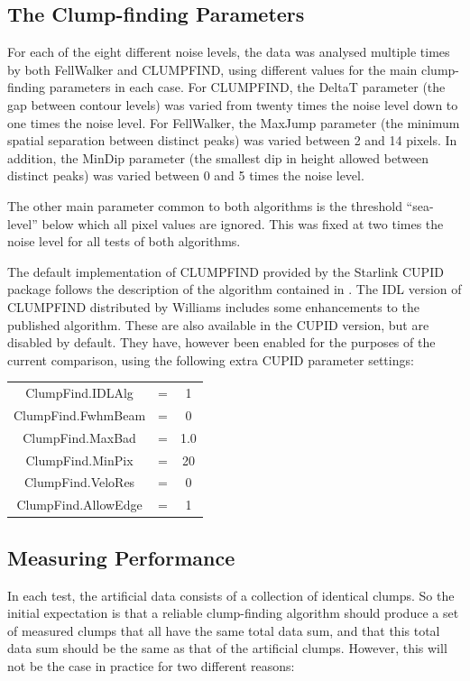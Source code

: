 \documentclass[final,authoryear,5p,times,twocolumn]{elsarticle}
\begin{document}
\subsection{The Clump-finding Parameters}
For each of the eight different noise levels, the data was analysed
multiple times by both FellWalker and CLUMPFIND, using different values
for the main clump-finding parameters in each case. For CLUMPFIND, the
DeltaT parameter (the gap between contour levels) was varied from twenty
times the noise level down to one times the noise level. For FellWalker,
the MaxJump parameter (the minimum spatial separation between distinct
peaks) was varied between 2 and 14 pixels. In addition, the MinDip
parameter (the smallest dip in height allowed between distinct peaks) was
varied between 0 and 5 times the noise level.

The other main parameter common to both algorithms is the threshold
``sea-level'' below which all pixel values are ignored. This was fixed at
two times the noise level for all tests of both algorithms.

The default implementation of CLUMPFIND provided by the Starlink CUPID
package follows the description of the algorithm contained in
\cite{1994Williams}. The IDL version of CLUMPFIND distributed by Williams
includes some enhancements to the published algorithm. These are also
available in the CUPID version, but are disabled by default. They have,
however been enabled for the purposes of the current comparison, using
the following extra CUPID parameter settings:

\smallskip
\begin{tabular}{c c c}
ClumpFind.IDLAlg & = & 1 \\
ClumpFind.FwhmBeam & = & 0 \\
ClumpFind.MaxBad & = & 1.0 \\
ClumpFind.MinPix & = & 20 \\
ClumpFind.VeloRes & = & 0 \\
ClumpFind.AllowEdge & = & 1 \\
\end{tabular}
\smallskip

\subsection{Measuring Performance}
In each test, the artificial data consists of a collection of identical
clumps. So the initial expectation is that a reliable clump-finding
algorithm should produce a set of measured clumps that all have the same
total data sum, and that this total data sum should be the same as that
of the artificial clumps. However, this will not be the case in practice
for two different reasons:
\end{document}
